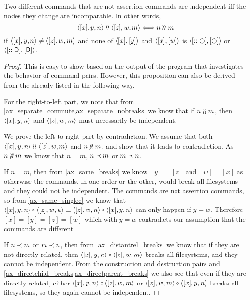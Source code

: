 \begin{mylem}
Two different commands that are not assertion commands are independent iff the nodes they change are incomparable. In other words,
\[ \langle{[x],y,n}\rangle\mathrel{\wr\wr}\langle{[z],w,m}\rangle \Longleftrightarrow n\mathrel{\wr\wr} m \]
if $\langle{[x],y,n}\rangle\neq\langle{[z],w,m}\rangle$ and none of $\langle{[x],[y]}\rangle$ and $\langle{[x],[w]}\rangle$ is $\langle{[::\ominus],[\ominus]}\rangle$ or $\langle{[::\mathsf{D}],[\mathsf{D}]}\rangle$.
\end{mylem}
\begin{proof}
This is easy to show based on the output of the program that investigates the behavior of command pairs.
However, this proposition can also be derived from the  already listed
in the following way.

For the right-to-left part, we note that
from \cref{ax_separate_commute,ax_separate_nobreaks} we know that
if $n\mathrel{\wr\wr} m$, then $\langle{[x],y,n}\rangle$ and $\langle{[z],w,m}\rangle$ must necessarily be independent.

We prove the left-to-right part by contradiction.
We assume that both $\langle{[x],y,n}\rangle\mathrel{\wr\wr}\langle{[z],w,m}\rangle$ and $n\nunrel m$,
and show that it leads to contradiction.
As $n\nunrel m$
we know that $n=m$, $n\prec m$ or $m\prec n$.

If $n=m$, then from \cref{ax_same_breaks} we know $[y]=[z]$ and $[w]=[x]$
as otherwise the commands, in one order or the other, would break all filesystems
and they could not be independent.
The commands are not assertion commands, so from \cref{ax_same_singlec}
we know that $\cxynv\cc\czwnv\equiv\czwnv\cc\cxynv$ can only happen if $y=w$.
Therefore $[x]=[y]=[z]=[w]$ which with $y=w$ contradicts our assumption that the commands are different.

If $n\prec m$ or $m\prec n$, then
from \cref{ax_distantrel_breaks} we know that if they are not directly related,
then $\cxynv\cc\czwmv$ breaks all filesystems, and they cannot be independent.
From the construction and destruction pairs and 
\cref{ax_directchild_breaks,ax_directparent_breaks} we also see that
even if they are directly related, either
$\cxynv\cc\czwmv$ or $\czwmv\cc\cxynv$ 
breaks all filesystems, so they again cannot be independent.
\end{proof}

